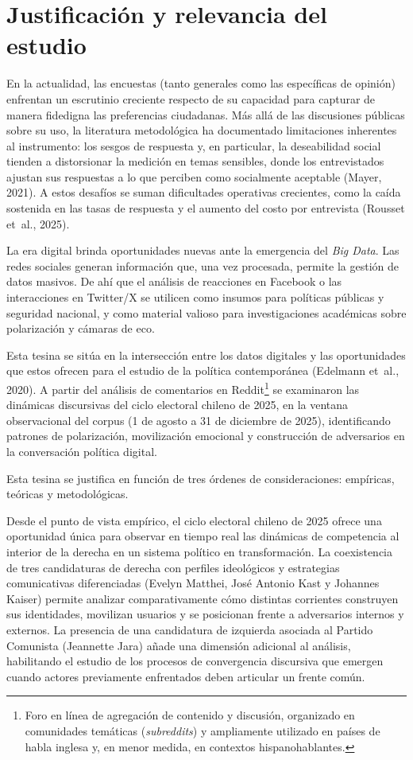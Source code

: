 \documentclass[
  letterpaper,
  numbers=noendperiod,
  fontsize=11pt,
  DIV=12,
  titlepage=false]{scrreprt}
\begin{document}
\section{Justificación y relevancia del
estudio}\label{justificaciuxf3n-y-relevancia-del-estudio}

En la actualidad, las encuestas (tanto generales como las específicas de
opinión) enfrentan un escrutinio creciente respecto de su capacidad para
capturar de manera fidedigna las preferencias ciudadanas. Más allá de
las discusiones públicas sobre su uso, la literatura metodológica ha
documentado limitaciones inherentes al instrumento: los sesgos de
respuesta y, en particular, la deseabilidad social tienden a
distorsionar la medición en temas sensibles, donde los entrevistados
ajustan sus respuestas a lo que perciben como socialmente aceptable
(Mayer, 2021). A estos desafíos se suman dificultades operativas
crecientes, como la caída sostenida en las tasas de respuesta y el
aumento del costo por entrevista (Rousset et~al., 2025).

La era digital brinda oportunidades nuevas ante la emergencia del
\emph{Big Data}. Las redes sociales generan información que, una vez
procesada, permite la gestión de datos masivos. De ahí que el análisis
de reacciones en Facebook o las interacciones en Twitter/X se utilicen
como insumos para políticas públicas y seguridad nacional, y como
material valioso para investigaciones académicas sobre polarización y
cámaras de eco.

Esta tesina se sitúa en la intersección entre los datos digitales y las
oportunidades que estos ofrecen para el estudio de la política
contemporánea (Edelmann et~al., 2020). A partir del análisis de
comentarios en Reddit\footnote{Foro en línea de agregación de contenido
  y discusión, organizado en comunidades temáticas (\emph{subreddits}) y
  ampliamente utilizado en países de habla inglesa y, en menor medida,
  en contextos hispanohablantes.} se examinaron las dinámicas
discursivas del ciclo electoral chileno de 2025, en la ventana
observacional del corpus (1 de agosto a 31 de diciembre de 2025),
identificando patrones de polarización, movilización emocional y
construcción de adversarios en la conversación política digital.

Esta tesina se justifica en función de tres órdenes de consideraciones:
empíricas, teóricas y metodológicas.

Desde el punto de vista empírico, el ciclo electoral chileno de 2025
ofrece una oportunidad única para observar en tiempo real las dinámicas
de competencia al interior de la derecha en un sistema político en
transformación. La coexistencia de tres candidaturas de derecha con
perfiles ideológicos y estrategias comunicativas diferenciadas (Evelyn
Matthei, José Antonio Kast y Johannes Kaiser) permite analizar
comparativamente cómo distintas corrientes construyen sus identidades,
movilizan usuarios y se posicionan frente a adversarios internos y
externos. La presencia de una candidatura de izquierda asociada al
Partido Comunista (Jeannette Jara) añade una dimensión adicional al
análisis, habilitando el estudio de los procesos de convergencia
discursiva que emergen cuando actores previamente enfrentados deben
articular un frente común.
\end{document}
